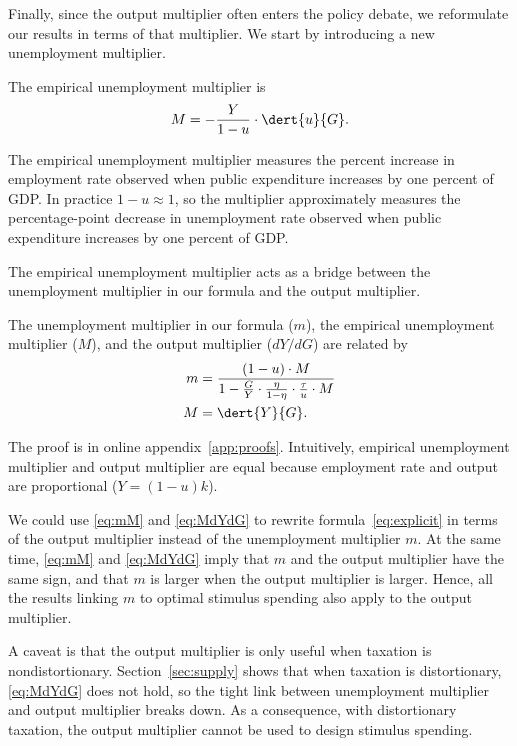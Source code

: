\documentclass[letterpaper,12pt,leqno]{article}
\begin{document}
\begin{bibunit}
Finally, since the output multiplier often enters the policy debate, we reformulate our results in terms of that multiplier. We start by introducing a new unemployment multiplier.

\begin{defn} The empirical unemployment multiplier is
\begin{equation}
M = -\frac{Y}{1-u}\cdot \dert{u}{G}.
\label{eq:M}\end{equation}\end{defn}

The empirical unemployment multiplier measures the percent increase in employment rate observed when public expenditure increases by one percent of GDP. In practice $1-u\approx 1$, so the multiplier approximately measures the percentage-point decrease in unemployment rate observed when public expenditure increases by one percent of GDP.

The empirical unemployment multiplier acts as a bridge between the unemployment multiplier in our formula and the output multiplier.

\begin{lem}\label{lem:multipliers} The unemployment multiplier in our formula ($m$), the empirical unemployment multiplier ($M$), and the output multiplier ($dY/dG$) are related by
\begin{align}
m&=\frac{(1-u) \cdot M}{1-\frac{G}{Y}\cdot \frac{\eta}{1-\eta}\cdot\frac{\tau}{u}\cdot M}\label{eq:mM}\\
M&=\dert{Y}{G}.\label{eq:MdYdG}
\end{align}\end{lem}

The proof is in online appendix~\ref{app:proofs}. Intuitively, empirical unemployment multiplier and output multiplier are equal because employment rate and output are proportional ($Y = (1-u) k$).

We could use \eqref{eq:mM} and \eqref{eq:MdYdG} to rewrite formula~\eqref{eq:explicit} in terms of the output multiplier instead of the unemployment multiplier $m$. At the same time, \eqref{eq:mM} and \eqref{eq:MdYdG} imply that $m$ and the output multiplier have the same sign, and that $m$ is larger when the output multiplier is larger. Hence, all the results linking $m$ to optimal stimulus spending also apply to the output multiplier.

A caveat is that the output multiplier is only useful when taxation is nondistortionary. Section~\ref{sec:supply} shows that when taxation is distortionary, \eqref{eq:MdYdG} does not hold, so the tight link between unemployment multiplier and output multiplier breaks down. As a consequence, with distortionary taxation, the output multiplier cannot be used to design stimulus spending.


\end{bibunit}
\end{document}
